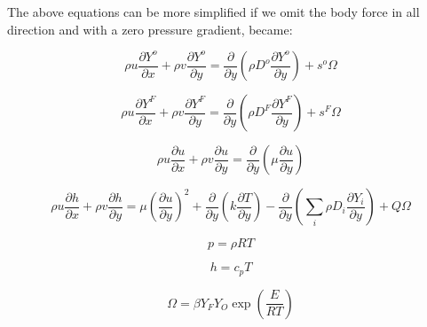 The above equations can be more simplified if we omit the body force
in all direction and  with a zero pressure gradient,  became: 

\begin{equation} 
\rho u\frac{\partial Y^{o}}{\partial x}+
\rho v\frac{\partial Y^{o}}{\partial y}
=
\frac{\partial}{\partial y}\left(\rho D^o\frac{\partial Y^o}{\partial y}\right)+
s^{o}\Omega
\end{equation} 

\begin{equation} 
\rho u\frac{\partial Y^{F}}{\partial x}+
\rho v\frac{\partial Y^{F}}{\partial y}
=
\frac{\partial}{\partial y}\left(\rho D^F\frac{\partial Y^F}{\partial y}\right)+
s^{F}\Omega
\end{equation} 

\begin{equation} 
\rho u\frac{\partial u}{\partial x}+
\rho v\frac{\partial u}{\partial y}=
\frac{\partial}{\partial y}\left(\mu\frac{\partial u}{\partial y}\right)
\end{equation} 

\begin{equation}
\rho u \frac{\partial h}{\partial x}+
\rho v \frac{\partial h}{\partial y}=
\mu\left(\frac{\partial u}{\partial y}\right)^2+
\frac{\partial}{\partial y}
\left(
   k\frac{\partial T}{\partial y}
   \right)
-
\frac{\partial}{\partial y}
\left(
\sum_i\rho D_i\frac{\partial Y_i}{\partial y}
\right)
+
Q\Omega
\end{equation} 

\begin{equation}
p=\rho R T
\end{equation} 

\begin{equation}
h=c_pT
\end{equation} 

\begin{equation}
\Omega=\beta Y_{F}Y_{O}\exp\left(\frac{E}{RT}\right)
\end{equation} 

